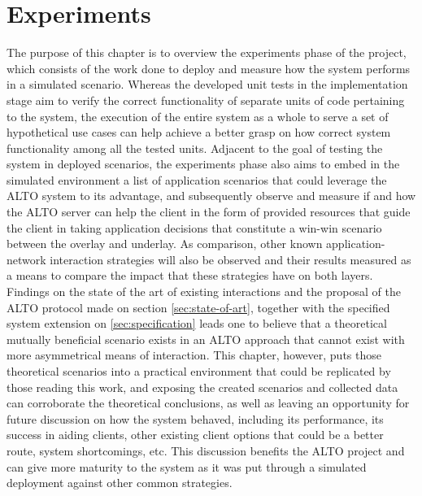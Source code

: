 \chapter{Experiments}

    The purpose of this chapter is to overview the experiments phase of the project, which consists of the work done to deploy and measure how the system performs in a simulated scenario.
    Whereas the developed unit tests in the implementation stage aim to verify the correct functionality of separate units of code pertaining to the system, the execution of the entire system as a whole to serve a set of hypothetical use cases can help achieve a better grasp on how correct system functionality among all the tested units.
    Adjacent to the goal of testing the system in deployed scenarios, the experiments phase also aims to embed in the simulated environment a list of application scenarios that could leverage the ALTO system to its advantage, and subsequently observe and measure if and how the ALTO server can help the client in the form of provided resources that guide the client in taking application decisions that constitute a win-win scenario between the overlay and underlay.
    As comparison, other known application-network interaction strategies will also be observed and their results measured as a means to compare the impact that these strategies have on both layers.
    Findings on the state of the art of existing interactions and the proposal of the ALTO protocol made on section \ref{sec:state-of-art}, together with the specified system extension on \ref{sec:specification} leads one to believe that a theoretical mutually beneficial scenario exists in an ALTO approach that cannot exist with more asymmetrical means of interaction.
    This chapter, however, puts those theoretical scenarios into a practical environment that could be replicated by those reading this work, and exposing the created scenarios and collected data can corroborate the theoretical conclusions, as well as leaving an opportunity for future discussion on how the system behaved, including its performance, its success in aiding clients, other existing client options that could be a better route, system shortcomings, etc.
    This discussion benefits the ALTO project and can give more maturity to the system as it was put through a simulated deployment against other common strategies.

